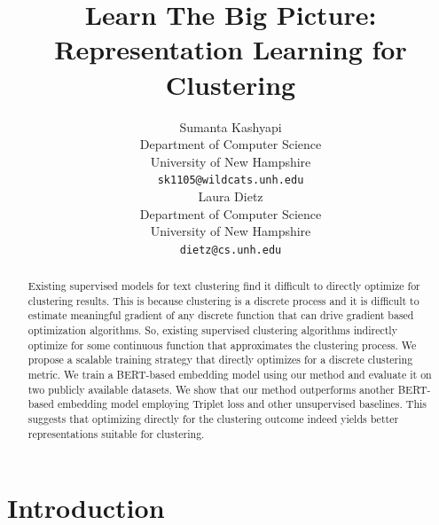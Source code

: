 \documentclass[11pt,a4paper]{article}
\title{Learn The Big Picture: Representation Learning for Clustering}
\author{Sumanta Kashyapi \\
  Department of Computer Science \\
  University of New Hampshire \\
  \texttt{sk1105@wildcats.unh.edu} \\\And
  Laura Dietz \\
  Department of Computer Science \\
  University of New Hampshire \\
  \texttt{dietz@cs.unh.edu} \\}
\date{}
\begin{document}
\maketitle
\begin{abstract}
Existing supervised models for text clustering find it difficult to directly optimize for clustering results. This is because clustering is a discrete process and it is difficult to estimate meaningful gradient of any discrete function that can drive gradient based optimization algorithms. So, existing supervised clustering algorithms indirectly optimize for some continuous function that approximates the clustering process. We propose a scalable training strategy that directly optimizes for a discrete clustering metric. We train a BERT-based embedding model using our method and evaluate it on two publicly available datasets. We show that our method outperforms another BERT-based embedding model employing Triplet loss and other unsupervised baselines. This suggests that optimizing directly for the clustering outcome indeed yields better representations suitable for clustering.
\end{abstract}

\section{Introduction}
\end{document}
